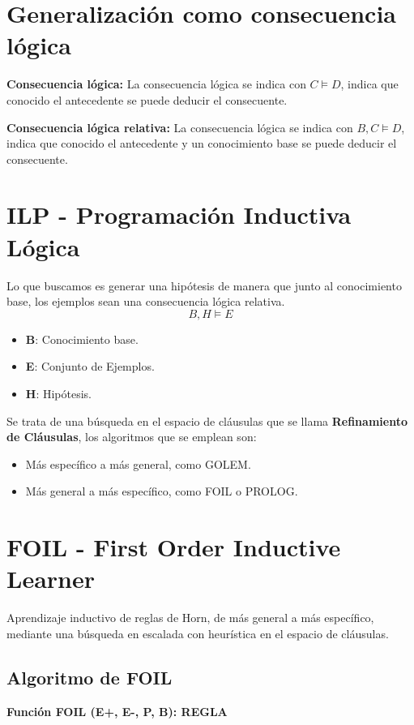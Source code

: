 \documentclass[12pt, twoside, openright]{report} %
\begin{document}
\section{Generalización como consecuencia lógica}
\textbf{Consecuencia lógica:} La consecuencia lógica se indica con $C \vDash D$, indica que conocido el antecedente se puede deducir el consecuente.

\textbf{Consecuencia lógica relativa:} La consecuencia lógica se indica con $B,C \vDash D$, indica que conocido el antecedente y un conocimiento base se puede deducir el consecuente.

\section{ILP - Programación Inductiva Lógica}
Lo que buscamos es generar una hipótesis de manera que junto al conocimiento base, los ejemplos sean una consecuencia lógica relativa.
$$B,H \vDash E$$
\begin{itemize}
	\item \textbf{B}: Conocimiento base.
	\item \textbf{E}: Conjunto de Ejemplos.
	\item \textbf{H}: Hipótesis.
\end{itemize}

Se trata de una búsqueda en el espacio de cláusulas que se llama \textbf{Refinamiento de Cláusulas}, los algoritmos que se emplean son:
\begin{itemize}
	\item Más específico a más general, como GOLEM.
	\item Más general a más específico, como FOIL o PROLOG.
\end{itemize}

\section{FOIL - First Order Inductive Learner}
Aprendizaje inductivo de reglas de Horn, de más general a más específico, mediante una búsqueda en escalada con heurística en el espacio de cláusulas.

\subsection{Algoritmo de FOIL}
\textbf{Función FOIL (E+, E-, P, B): REGLA}
\end{document}
